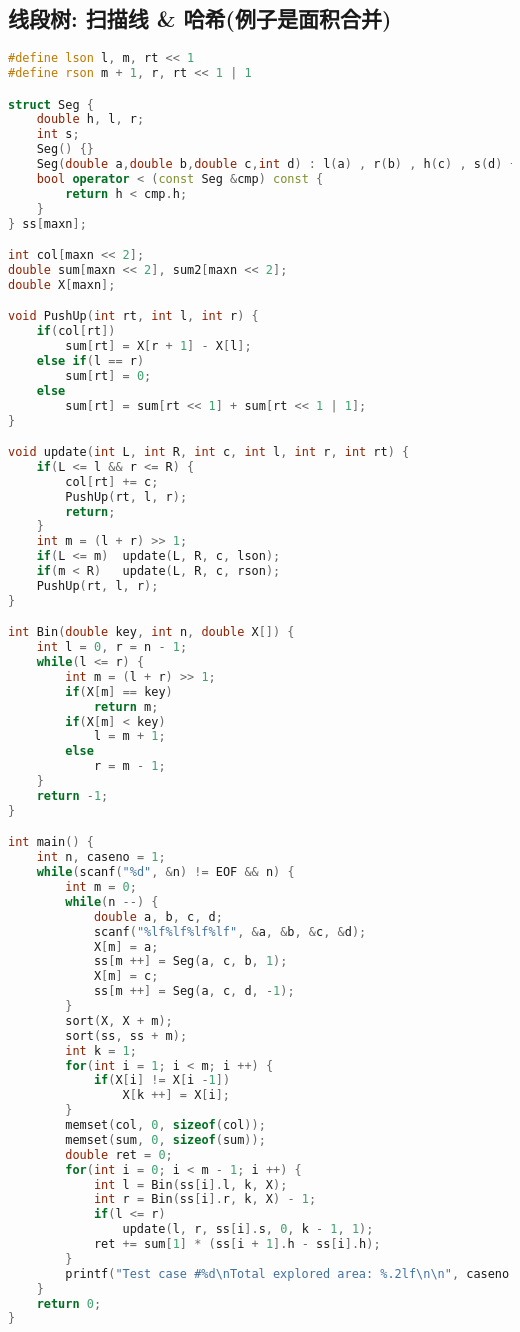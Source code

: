 \subsection{线段树: 扫描线 & 哈希(例子是面积合并)}
    \begin{lstlisting}[language=c++]
#define lson l, m, rt << 1
#define rson m + 1, r, rt << 1 | 1

struct Seg {
    double h, l, r;
    int s; 
    Seg() {}
    Seg(double a,double b,double c,int d) : l(a) , r(b) , h(c) , s(d) {}
	bool operator < (const Seg &cmp) const {
		return h < cmp.h;
	}
} ss[maxn];

int col[maxn << 2];
double sum[maxn << 2], sum2[maxn << 2];
double X[maxn];

void PushUp(int rt, int l, int r) {
    if(col[rt])
        sum[rt] = X[r + 1] - X[l];
    else if(l == r)
        sum[rt] = 0;
    else
        sum[rt] = sum[rt << 1] + sum[rt << 1 | 1];
}

void update(int L, int R, int c, int l, int r, int rt) {
    if(L <= l && r <= R) {
        col[rt] += c;
        PushUp(rt, l, r);
        return;
    }
    int m = (l + r) >> 1;
    if(L <= m)  update(L, R, c, lson);
    if(m < R)   update(L, R, c, rson);
    PushUp(rt, l, r);
}

int Bin(double key, int n, double X[]) {
    int l = 0, r = n - 1;
    while(l <= r) {
        int m = (l + r) >> 1;
        if(X[m] == key) 
            return m;
        if(X[m] < key)  
            l = m + 1;
        else
            r = m - 1;
    }
    return -1;
}

int main() {
    int n, caseno = 1;
    while(scanf("%d", &n) != EOF && n) {
        int m = 0;
        while(n --) {
            double a, b, c, d;
            scanf("%lf%lf%lf%lf", &a, &b, &c, &d);
            X[m] = a;
            ss[m ++] = Seg(a, c, b, 1);
            X[m] = c;
            ss[m ++] = Seg(a, c, d, -1);
        }
        sort(X, X + m);
        sort(ss, ss + m);
        int k = 1;
        for(int i = 1; i < m; i ++) {
            if(X[i] != X[i -1])
                X[k ++] = X[i];
        }
        memset(col, 0, sizeof(col));
        memset(sum, 0, sizeof(sum));
        double ret = 0;
        for(int i = 0; i < m - 1; i ++) {
            int l = Bin(ss[i].l, k, X);
            int r = Bin(ss[i].r, k, X) - 1;
            if(l <= r)
                update(l, r, ss[i].s, 0, k - 1, 1);
            ret += sum[1] * (ss[i + 1].h - ss[i].h);
        }
        printf("Test case #%d\nTotal explored area: %.2lf\n\n", caseno ++, ret);
    }
    return 0;
}
    \end{lstlisting}
